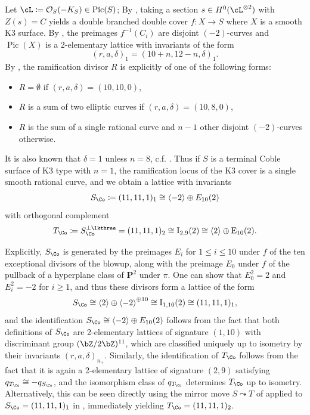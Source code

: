 \documentclass{amsart}
\providecommand{\tightlist}{%
  \setlength{\itemsep}{0pt}\setlength{\parskip}{0pt}}
\begin{document}
\begin{remark}

Let \(\cL \coloneqq{\mathcal{O}}_S(-K_S) \in \operatorname{Pic}(S)\); By \cite[Prop. 9.1.1]{EnriquesTwo}, taking a section \(s\in H^0(\cL ^{\otimes 2})\) with \(Z(s) = C\) yields a double branched double cover \(f: X\to S\) where \(X\) is a smooth K3 surface. By \cite[Def. 5.4.3]{EnriquesOne}, the preimages \(f^{-1}(C_i)\) are disjoint \((-2)\)-curves and \(\operatorname{Pic}(X)\) is a 2-elementary lattice with invariants of the form \[
(r,a,\delta)_1 = (10+n, 12-n, \delta)_1
.\] By \cite[Def. 5.4.3, Eqn. 5.3.1]{EnriquesOne}, the ramification divisor \(R\) is explicitly of one of the following forms:

\begin{itemize}
\tightlist
\item
  \(R=\emptyset\) if \((r,a,\delta) = (10, 10, 0)\),
\item
  \(R\) is a sum of two elliptic curves if \((r,a,\delta) = (10, 8, 0)\),
\item
  \(R\) is the sum of a single rational curve and \(n-1\) other disjoint \((-2)\)-curves otherwise.
\end{itemize}

It is also known that \(\delta=1\) unless \(n=8\), c.f. \cite[Table\, 5.1]{EnriquesOne}. Thus if \(S\) is a terminal Coble surface of K3 type with \(n=1\), the ramification locus of the K3 cover is a single smooth rational curve, and we obtain a lattice with invariants \[
S_{\Co} \coloneqq(11, 11, 1)_1 \cong \left\langle{-2}\right\rangle \oplus E_{10}(2)
\] with orthogonal complement \[
T_{\Co} \coloneqq S_{\Co}^{\perp \lkthree} = (11, 11, 1)_2 \cong \rm{I}_{2, 9}(2) \cong \left\langle{2}\right\rangle \oplus E_{10}(2)
.\]

Explicitly, \(S_{\Co}\) is generated by the preimages \(E_i\) for \(1\leq i \leq 10\) under \(f\) of the ten exceptional divisors of the blowup, along with the preimage \(E_0\) under \(f\) of the pullback of a hyperplane class of \({\mathbf{P}}^2\) under \(\pi\). One can show that \(E_0^2=2\) and \(E_i^2 = -2\) for \(i\geq 1\), and thus these divisors form a lattice of the form \[
S_{\Co} \cong \left\langle{2}\right\rangle \oplus \left\langle{-2}\right\rangle^{\oplus 10} \cong \rm{I}_{1, 10}(2) \cong (11, 11, 1)_1
,\] and the identification \(S_{\Co} \cong \left\langle{-2}\right\rangle \oplus E_{10}(2)\) follows from the fact that both definitions of \(S_{\Co}\) are 2-elementary lattices of signature \((1, 10)\) with discriminant group \((\bZ/2\bZ)^{11}\), which are classified uniquely up to isometry by their invariants \((r,a,\delta)_{n_+}\). Similarly, the identification of \(T_{\Co}\) follows from the fact that it is again a 2-elementary lattice of signature \((2, 9)\) satisfying \(q_{T_{\Co}} \cong -q_{S_{\Co}}\), and the isomorphism class of \(q_{T_{\Co}}\) determines \(T_{\Co}\) up to isometry. Alternatively, this can be seen directly using the mirror move \(S\leadsto T\) of \cite[Thm. 5.10]{AE22nonsympinv} applied to \(S_\Co =(11, 11, 1)_1\) in \cite[Fig.\,1]{AE22nonsympinv}, immediately yielding \(T_{\Co} = (11, 11, 1)_2\).


\end{remark}
\end{document}

